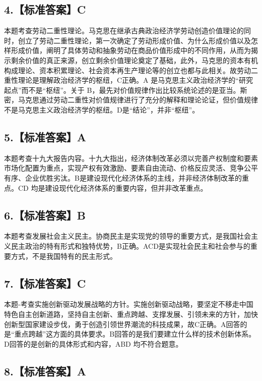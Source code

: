 \documentclass[UTF8,11pt]{ctexart}
\begin{document}
\subsection*{4.【标准答案】C}

本题考查劳动二重性理论。马克思在继承古典政治经济学劳动创造价值理论的同时，创立了劳动二重性理论，第一次确定了劳动形成价值、为什么形成价值以及怎样形成价值，阐明了具体劳动和抽象劳动在商品价值形成中的不同作用，从而为揭示剩余价值的真正来源，创立剩余价值理论奠定了基础，此外，马克思的资本有机构成理论、资本积累理论、社会资本再生产理论等的创立也都与此相关。故劳动二重性理论是理解政治经济学的枢纽，C正确。A 是马克思主义政治经济学的“研究起点”而不是“枢纽”。关于 B，最先对价值规律作出比较系统论述的是亚当。斯密，马克思通过劳动二重性对价值规律进行了充分的解释和理论论证，但价值规律不是马克思主义政治经济学的枢纽。D是“结论”，并非“枢纽”。


\subsection*{5.【标准答案】A}

本题考查十九大报告内容。十九大指出，经济体制改革必须以完善产权制度和要素市场化配置为重点，实现产权有效激励、要素自由流动、价格反应灵活、竞争公平有序、企业优胜劣汰。B是建设现代化经济体系的主线，并非经济体制改革的重点。CD 均是建设现代化经济体系的重要内容，但并非改革重点。


\subsection*{6.【标准答案】B}

本题考查发展社会主义民主。协商民主是实现党的领导的重要方式，是我国社会主义民主政治的特有形式和独特优势，B正确。ACD是实现社会民主和社会参与的重要方式，不是我国特有的民主形式。


\subsection*{7.【标准答案】C}

本题-考查实施创新驱动发展战略的方针。实施创新驱动战略，要坚定不移走中国特色自主创新道路，坚持自主创新、重点跨越、支撑发展、引领未来的方针，加快创新型国家建设步伐，勇于创造引领世界潮流的科技成果，故C正确。A回答的是“重点跨越”这方面的具体要求。B回答的是我们要建立什么样的技术创新体系。D回答的是创新的具体形式和内容，ABD 均不符合题意。


\subsection*{8.【标准答案】A}
\end{document}
